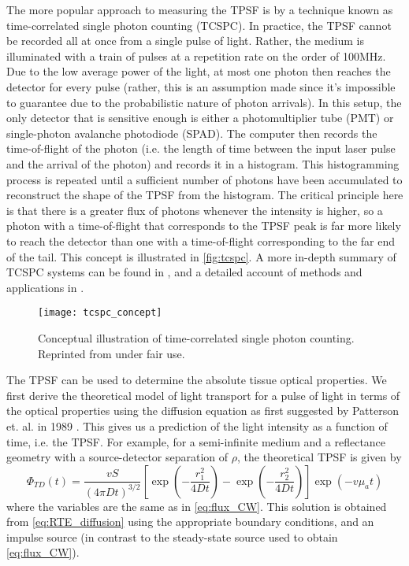 The more popular approach to measuring the TPSF is by a technique known as time-correlated single photon counting (TCSPC). In practice, the TPSF cannot be recorded all at once from a single pulse of light. Rather, the medium is illuminated with a train of pulses at a repetition rate on the order of 100MHz. Due to the low average power of the light, at most one photon then reaches the detector for every pulse (rather, this is an assumption made since it's impossible to guarantee due to the probabilistic nature of photon arrivals). In this setup, the only detector that is sensitive enough is either a photomultiplier tube (PMT) or single-photon avalanche photodiode (SPAD). The computer then records the time-of-flight of the photon (i.e. the length of time between the input laser pulse and the arrival of the photon) and records it in a histogram. This histogramming process is repeated until a sufficient number of photons have been accumulated to reconstruct the shape of the TPSF from the histogram. The critical principle here is that there is a greater flux of photons whenever the intensity is higher, so a photon with a time-of-flight that corresponds to the TPSF peak is far more likely to reach the detector than one with a time-of-flight corresponding to the far end of the tail. This concept is illustrated in \autoref{fig:tcspc}. A more in-depth summary of TCSPC systems can be found in \cite{Wahl2014}, and a detailed account of methods and applications in \cite{Becker2005, Becker2014}.

\begin{figure}[tb]
    \centering
    \texttt{[image: tcspc\_concept]}
    \caption{Conceptual illustration of time-correlated single photon counting. Reprinted from \cite{Becker2014} under fair use.}
    \label{fig:tcspc}
\end{figure}

The TPSF can be used to determine the absolute tissue optical properties. We first derive the theoretical model of light transport for a pulse of light in terms of the optical properties using the diffusion equation as first suggested by Patterson et. al. in 1989 \cite{Patterson1989}. This gives us a prediction of the light intensity as a function of time, i.e. the TPSF. For example, for a semi-infinite medium and a reflectance geometry with a source-detector separation of $\rho$, the theoretical TPSF is given by \cite{Kienle1997} 
\begin{equation} \label{eq:TPSF}
\Phi_{TD}(t) = \frac{vS}{(4\pi D t)^{3/2}} 
\left[ 
\exp( -\frac{r_1^2} {4Dt} )
-\exp( -\frac{r_2^2} {4Dt} ) 
\right]
\exp(-v\mu_a t)
\end{equation}
where the variables are the same as in \autoref{eq:flux_CW}. This solution is obtained from \autoref{eq:RTE_diffusion} using the appropriate boundary conditions, and an impulse source (in contrast to the steady-state source used to obtain \autoref{eq:flux_CW}). 

